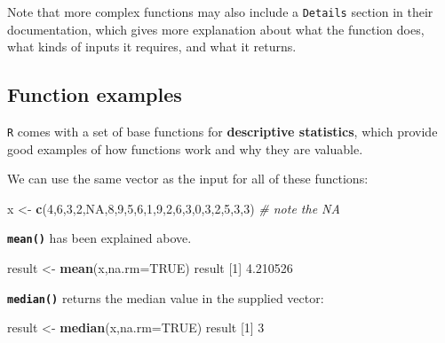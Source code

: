 \documentclass[
]{book}
\newenvironment{Shaded}{\begin{snugshade}}{\end{snugshade}}
\newcommand{\AttributeTok}[1]{\textcolor[rgb]{0.13,0.29,0.53}{#1}}
\newcommand{\CommentTok}[1]{\textcolor[rgb]{0.56,0.35,0.01}{\textit{#1}}}
\newcommand{\ConstantTok}[1]{\textcolor[rgb]{0.56,0.35,0.01}{#1}}
\newcommand{\DecValTok}[1]{\textcolor[rgb]{0.00,0.00,0.81}{#1}}
\newcommand{\FloatTok}[1]{\textcolor[rgb]{0.00,0.00,0.81}{#1}}
\newcommand{\FunctionTok}[1]{\textcolor[rgb]{0.13,0.29,0.53}{\textbf{#1}}}
\newcommand{\NormalTok}[1]{#1}
\newcommand{\OtherTok}[1]{\textcolor[rgb]{0.56,0.35,0.01}{#1}}
\begin{document}
Note that more complex functions may also include a \texttt{Details} section in their documentation, which gives more explanation about what the function does, what kinds of inputs it requires, and what it returns.

\subsection*{Function examples}\label{function-examples}

\texttt{R} comes with a set of base functions for \textbf{descriptive statistics}, which provide good examples of how functions work and why they are valuable.

We can use the same vector as the input for all of these functions:

\begin{Shaded}
\begin{Highlighting}[]
\NormalTok{x }\OtherTok{\textless{}{-}} \FunctionTok{c}\NormalTok{(}\DecValTok{4}\NormalTok{,}\DecValTok{6}\NormalTok{,}\DecValTok{3}\NormalTok{,}\DecValTok{2}\NormalTok{,}\ConstantTok{NA}\NormalTok{,}\DecValTok{8}\NormalTok{,}\DecValTok{9}\NormalTok{,}\DecValTok{5}\NormalTok{,}\DecValTok{6}\NormalTok{,}\DecValTok{1}\NormalTok{,}\DecValTok{9}\NormalTok{,}\DecValTok{2}\NormalTok{,}\DecValTok{6}\NormalTok{,}\DecValTok{3}\NormalTok{,}\DecValTok{0}\NormalTok{,}\DecValTok{3}\NormalTok{,}\DecValTok{2}\NormalTok{,}\DecValTok{5}\NormalTok{,}\DecValTok{3}\NormalTok{,}\DecValTok{3}\NormalTok{)  }\CommentTok{\# note the NA}
\end{Highlighting}
\end{Shaded}

\textbf{\texttt{mean()}} has been explained above.

\begin{Shaded}
\begin{Highlighting}[]
\NormalTok{result }\OtherTok{\textless{}{-}} \FunctionTok{mean}\NormalTok{(x,}\AttributeTok{na.rm=}\ConstantTok{TRUE}\NormalTok{)}
\NormalTok{result}
\NormalTok{[}\DecValTok{1}\NormalTok{] }\FloatTok{4.210526}
\end{Highlighting}
\end{Shaded}

\textbf{\texttt{median()}} returns the median value in the supplied vector:

\begin{Shaded}
\begin{Highlighting}[]
\NormalTok{result }\OtherTok{\textless{}{-}} \FunctionTok{median}\NormalTok{(x,}\AttributeTok{na.rm=}\ConstantTok{TRUE}\NormalTok{)}
\NormalTok{result}
\NormalTok{[}\DecValTok{1}\NormalTok{] }\DecValTok{3}
\end{Highlighting}
\end{Shaded}
\end{document}
